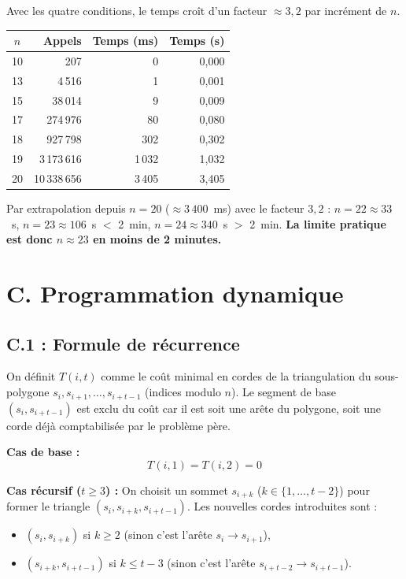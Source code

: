 \documentclass[12pt,a4paper]{article}
\begin{document}
Avec les quatre conditions, le temps croît d'un facteur $\approx 3{,}2$ par incrément
de $n$.

\begin{center}
\begin{tabular}{crrr}
\toprule
$n$ & Appels & Temps (ms) & Temps (s) \\
\midrule
 10 &              207 &       0 &   0,000 \\
 13 &            4\,516 &       1 &   0,001 \\
 15 &           38\,014 &       9 &   0,009 \\
 17 &          274\,976 &      80 &   0,080 \\
 18 &          927\,798 &     302 &   0,302 \\
 19 &        3\,173\,616 &   1\,032 &   1,032 \\
 20 &       10\,338\,656 &   3\,405 &   3,405 \\
\bottomrule
\end{tabular}
\end{center}

Par extrapolation depuis $n = 20$ ($\approx 3\,400$~ms) avec le facteur $3{,}2$ :
$n = 22 \approx 33$~s, $n = 23 \approx 106$~s $<$ 2~min, $n = 24 \approx 340$~s $>$ 2~min.
\textbf{La limite pratique est donc $n \approx 23$ en moins de 2 minutes.}

\clearpage
\section{C. Programmation dynamique}

\subsection{C.1 : Formule de récurrence}

On définit $T(i, t)$ comme le coût minimal en cordes de la triangulation du sous-polygone
$s_i, s_{i+1}, \ldots, s_{i+t-1}$ (indices modulo $n$). Le segment de base
$(s_i, s_{i+t-1})$ est exclu du coût car il est soit une arête du polygone, soit une corde
déjà comptabilisée par le problème père.

\textbf{Cas de base :}
\[
  T(i, 1) = T(i, 2) = 0
\]

\textbf{Cas récursif ($t \geq 3$) :} On choisit un sommet $s_{i+k}$ ($k \in \{1, \ldots,
t-2\}$) pour former le triangle $(s_i, s_{i+k}, s_{i+t-1})$. Les nouvelles cordes
introduites sont :
\begin{itemize}
  \item $(s_i, s_{i+k})$ si $k \geq 2$ (sinon c'est l'arête $s_i \to s_{i+1}$),
  \item $(s_{i+k}, s_{i+t-1})$ si $k \leq t-3$ (sinon c'est l'arête $s_{i+t-2} \to s_{i+t-1}$).
\end{itemize}
\end{document}
